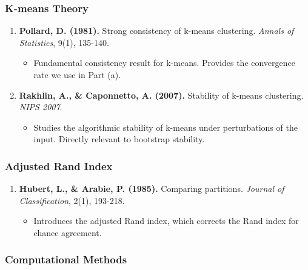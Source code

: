 \documentclass[
  12pt,
]{ctexart}
\providecommand{\tightlist}{%
  \setlength{\itemsep}{0pt}\setlength{\parskip}{0pt}}
\begin{document}
\subsubsection{K-means Theory}\label{k-means-theory}

\begin{enumerate}
\def\labelenumi{\arabic{enumi}.}
\setcounter{enumi}{4}
\tightlist
\item
  \textbf{Pollard, D. (1981).} Strong consistency of k-means clustering.
  \emph{Annals of Statistics}, 9(1), 135-140.

  \begin{itemize}
  \tightlist
  \item
    Fundamental consistency result for k-means. Provides the convergence
    rate we use in Part (a).
  \end{itemize}
\item
  \textbf{Rakhlin, A., \& Caponnetto, A. (2007).} Stability of k-means
  clustering. \emph{NIPS 2007}.

  \begin{itemize}
  \tightlist
  \item
    Studies the algorithmic stability of k-means under perturbations of
    the input. Directly relevant to bootstrap stability.
  \end{itemize}
\end{enumerate}

\subsubsection{Adjusted Rand Index}\label{adjusted-rand-index}

\begin{enumerate}
\def\labelenumi{\arabic{enumi}.}
\setcounter{enumi}{6}
\tightlist
\item
  \textbf{Hubert, L., \& Arabie, P. (1985).} Comparing partitions.
  \emph{Journal of Classification}, 2(1), 193-218.

  \begin{itemize}
  \tightlist
  \item
    Introduces the adjusted Rand index, which corrects the Rand index
    for chance agreement.
  \end{itemize}
\end{enumerate}

\subsubsection{Computational Methods}\label{computational-methods}
\end{document}
